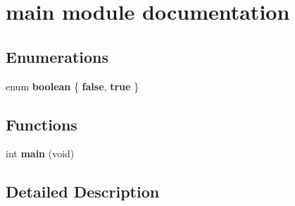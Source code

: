 \hypertarget{group__main__module}{}\section{main module documentation}
\label{group__main__module}
\subsection*{Enumerations}
\begin{DoxyCompactItemize}
\item 
\mbox{\label{group__main__module_ga7c6368b321bd9acd0149b030bb8275ed}} 
enum {\bfseries boolean} \{ {\bfseries false}, 
{\bfseries true}
 \}
\end{DoxyCompactItemize}
\subsection*{Functions}
\begin{DoxyCompactItemize}
\item 
\mbox{\label{group__main__module_ga840291bc02cba5474a4cb46a9b9566fe}} 
int {\bfseries main} (void)
\end{DoxyCompactItemize}


\subsection{Detailed Description}
